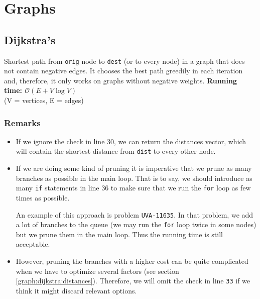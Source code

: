 \documentclass[12pt]{report}
\begin{document}
\newpage
{}



\chapter{Graphs}

\section{Dijkstra's}
Shortest path from \texttt{orig} node to \texttt{dest} (or to every node) in a graph
that does not contain negative edges. 
It chooses the best path greedily in each iteration and, therefore, it only works
on graphs without negative weights. 
\noindent \textbf{\boldmath Running time: $\mathcal{O}(E+V\log V)$}
\\ {\small(V = vertices, E = edges)}
\subsection*{Remarks}
\begin{itemize}
	\item If we ignore the check in line 30, we can return the distances 
		vector, which will contain the shortest distance from \texttt{dist}
		to every other node.
	\item If we are doing some kind of pruning it is imperative that we prune 
	as many branches as possible in the main loop. That is to say, we should
	introduce as many \texttt{if} statements in line 36 to make sure that we
	run the \texttt{for} loop as few times as possible. 

	An example of this approach is problem \texttt{UVA-11635}. In that problem, we
	add a lot of branches to the queue (we may run the \texttt{for} loop
	twice in some nodes) but we prune them in the main loop. Thus the 
	running time is still acceptable.

\item  However, pruning the branches with a higher cost can be quite complicated 
	when we have to optimize several factors (see section \ref{graph:dijkstra:distances}).
	Therefore, we will omit the check in line \texttt{33} if we think it might discard 
	relevant options.

\end{itemize}

\newpage
\end{document}
